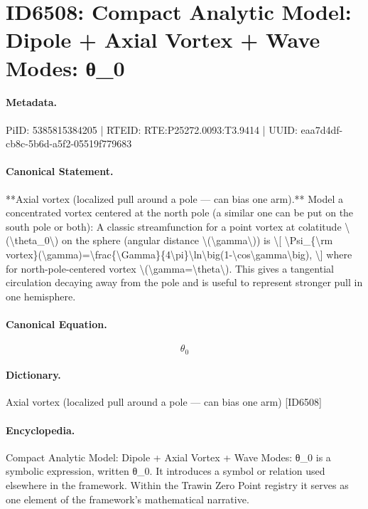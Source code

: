 \section*{ID6508: Compact Analytic Model: Dipole + Axial Vortex + Wave Modes: θ\_0}
\paragraph{Metadata.}
PiID: 5385815384205 | RTEID: RTE:P25272.0093:T3.9414 | UUID: eaa7d4df-cb8c-5b6d-a5f2-05519f779683

\paragraph{Canonical Statement.}
**Axial vortex (localized pull around a pole — can bias one arm).** Model a concentrated vortex centered at the north pole (a similar one can be put on the south pole or both): A classic streamfunction for a point vortex at colatitude \textbackslash{}(\textbackslash{}theta\_0\textbackslash{}) on the sphere (angular distance \textbackslash{}(\textbackslash{}gamma\textbackslash{})) is \textbackslash{}[ \textbackslash{}Psi\_\{\textbackslash{}rm vortex\}(\textbackslash{}gamma)=\textbackslash{}frac\{\textbackslash{}Gamma\}\{4\textbackslash{}pi\}\textbackslash{}ln\textbackslash{}big(1-\textbackslash{}cos\textbackslash{}gamma\textbackslash{}big), \textbackslash{}] where for north-pole-centered vortex \textbackslash{}(\textbackslash{}gamma=\textbackslash{}theta\textbackslash{}). This gives a tangential circulation decaying away from the pole and is useful to represent stronger pull in one hemisphere.

\paragraph{Canonical Equation.}
\[
\theta_0
\]

\paragraph{Dictionary.}
Axial vortex (localized pull around a pole — can bias one arm) [ID6508]

\paragraph{Encyclopedia.}
Compact Analytic Model: Dipole + Axial Vortex + Wave Modes: θ\_0 is a symbolic expression, written θ\_0. It introduces a symbol or relation used elsewhere in the framework. Within the Trawin Zero Point registry it serves as one element of the framework's mathematical narrative.
